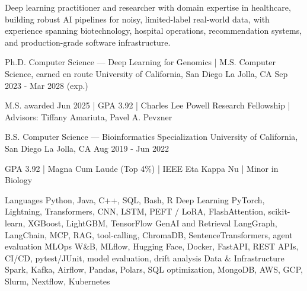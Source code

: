 \documentclass[11pt, a4paper]{awesome-cv}
\begin{document}
\makecvheader

\begin{cvparagraph}
Deep learning practitioner and researcher with domain expertise in healthcare, building robust AI pipelines for noisy, limited-label real-world data, with experience spanning biotechnology, hospital operations, recommendation systems, and production-grade software infrastructure.
\end{cvparagraph}

\begin{cventries}
\cventry
{Ph.D. Computer Science — Deep Learning for Genomics \quad | \quad M.S. Computer Science, earned en route}
{University of California, San Diego}
{La Jolla, CA}
{Sep 2023 - Mar 2028 (exp.)}
{
\begin{cvitems}
\item {M.S. awarded Jun 2025 {\enspace}|{\enspace} GPA 3.92 {\enspace}|{\enspace} Charles Lee Powell Research Fellowship {\enspace}|{\enspace} Advisors: Tiffany Amariuta, Pavel A. Pevzner}
\end{cvitems}
}

\cventry
{B.S. Computer Science — Bioinformatics Specialization}
{University of California, San Diego}
{La Jolla, CA}
{Aug 2019 - Jun 2022}
{
\begin{cvitems}
\item {GPA 3.92 {\enspace}|{\enspace} Magna Cum Laude (Top 4\%) {\enspace}|{\enspace} IEEE Eta Kappa Nu {\enspace}|{\enspace} Minor in Biology}
\end{cvitems}
}
\end{cventries}

\begin{cvskills}
  \cvskill
    {Languages}
    {Python, Java, C++, SQL, Bash, R}
  \cvskill
    {Deep Learning}
    {PyTorch, Lightning, Transformers, CNN, LSTM, PEFT / LoRA, FlashAttention, scikit-learn, XGBoost, LightGBM, TensorFlow}
  \cvskill
    {GenAI and Retrieval}
    {LangGraph, LangChain, MCP, RAG, tool-calling, ChromaDB, SentenceTransformers, agent evaluation}
  \cvskill
    {MLOps}
    {W\&B, MLflow, Hugging Face, Docker, FastAPI, REST APIs, CI/CD, pytest/JUnit, model evaluation, drift analysis}
  \cvskill
    {Data \& Infrastructure}
    {Spark, Kafka, Airflow, Pandas, Polars, SQL optimization, MongoDB, AWS, GCP, Slurm, Nextflow, Kubernetes}

\end{cvskills}
\end{document}
